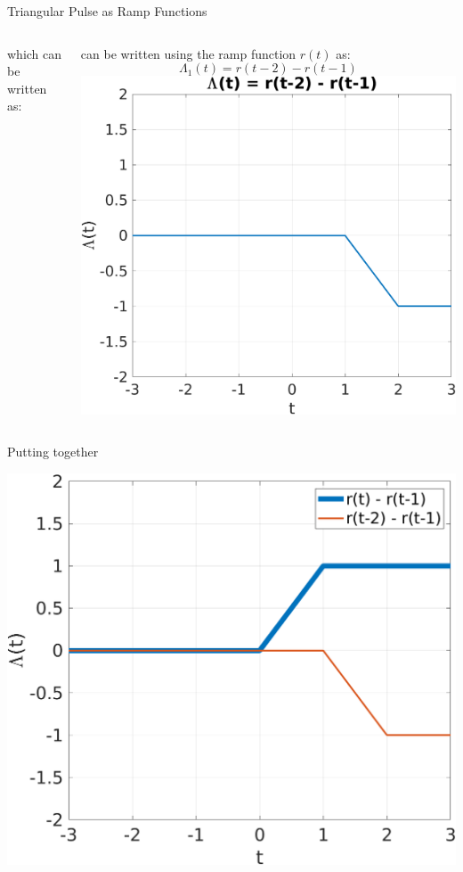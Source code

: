 \documentclass[aspectratio=169,xcolor=dvipsnames,svgnames,x11names,fleqn]{beamer}
\begin{document}
\begin{frame}[allowframebreaks]{Triangular Pulse as Ramp Functions}
\begin{columns}
 which can be written as:

can be written using the ramp function \( r(t) \) as:
    \begin{equation*}
        \Lambda_1(t) = r(t-2) - r(t-1)
    \end{equation*}
    \includegraphics[width=0.95\linewidth,trim=0 0 0 0cm,clip]{figures/lambda_2.png}
\end{columns}

   Putting together 
  
   \centering
   
     \includegraphics[width=0.40\linewidth,trim=0 0 0 0cm,clip]{figures/lambda_1_2.png}

\end{frame}
\end{document}
